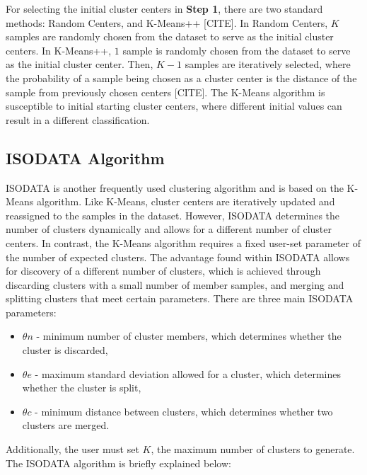 \documentclass[twoside,twocolumn]{article}
\begin{document}
For selecting the initial cluster centers in \textbf{Step 1}, there are two
standard methods: Random Centers, and K-Means++ [CITE]. In Random Centers, $K$
samples are randomly chosen from the dataset to serve as the initial cluster
centers. In K-Means++, $1$ sample is randomly chosen from the dataset to serve
as the initial cluster center. Then, $K-1$ samples are iteratively selected,
where the probability of a sample being chosen as a cluster center is the
distance of the sample from previously chosen centers [CITE]. The K-Means
algorithm is susceptible to initial starting cluster centers, where different
initial values can result in a different classification.
 

\subsection{ISODATA Algorithm}

ISODATA is another frequently used clustering algorithm and is based on the
K-Means algorithm. Like K-Means, cluster centers are iteratively updated and
reassigned to the samples in the dataset. However, ISODATA determines the number
of clusters dynamically and allows for a different number of cluster centers. In
contrast, the K-Means algorithm requires a fixed user-set parameter of the
number of expected clusters. The advantage found within ISODATA allows for
discovery of a different number of clusters, which is achieved through
discarding clusters with a small number of member samples, and merging and
splitting clusters that meet certain parameters. There are three main ISODATA
parameters:

\begin{itemize}
\item $\theta n$ - minimum number of cluster members, which determines whether
the cluster is discarded,
\item $\theta e$ - maximum standard deviation allowed for a cluster, which
determines whether the cluster is split,
\item $\theta c$ - minimum distance between clusters, which determines whether
two clusters are merged.
\end{itemize}

Additionally, the user must set $K$, the maximum number of clusters to generate.
The ISODATA algorithm is briefly explained below:
\end{document}
